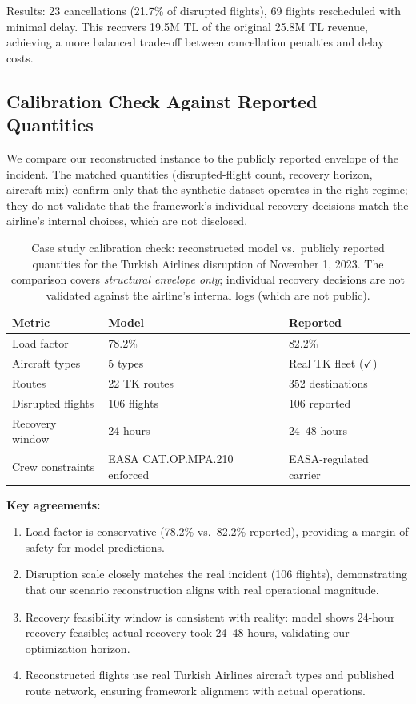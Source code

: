 \documentclass[12pt,number]{elsarticle}
\begin{document}
Results: 23 cancellations (21.7\% of disrupted flights), 69 flights rescheduled with minimal delay. This recovers 19.5M TL of the original 25.8M TL revenue, achieving a more balanced trade-off between cancellation penalties and delay costs.

\subsection{Calibration Check Against Reported Quantities}

We compare our reconstructed instance to the publicly reported envelope of the incident. The matched quantities (disrupted-flight count, recovery horizon, aircraft mix) confirm only that the synthetic dataset operates in the right regime; they do not validate that the framework's individual recovery decisions match the airline's internal choices, which are not disclosed.

\begin{table}[H]
\centering
\small
\caption{Case study calibration check: reconstructed model vs.\ publicly reported quantities for the Turkish Airlines disruption of November 1, 2023. The comparison covers \emph{structural envelope only}; individual recovery decisions are not validated against the airline's internal logs (which are not public).}
\label{tab:casestudy}
\begin{tabular}{@{}p{2.5cm}p{3cm}p{3cm}@{}}
\toprule
\textbf{Metric} & \textbf{Model} & \textbf{Reported} \\
\midrule
Load factor & 78.2\% & 82.2\% \\
Aircraft types & 5 types & Real TK fleet ($\checkmark$) \\
Routes & 22 TK routes & 352 destinations \\
Disrupted flights & 106 flights & 106 reported \\
Recovery window & 24 hours & 24--48 hours \\
Crew constraints & EASA CAT.OP.MPA.210 enforced & EASA-regulated carrier \\
\bottomrule
\end{tabular}
\end{table}

\textbf{Key agreements:}
\begin{enumerate}
\item Load factor is conservative (78.2\% vs.\ 82.2\% reported), providing a margin of safety for model predictions.
\item Disruption scale closely matches the real incident (106 flights), demonstrating that our scenario reconstruction aligns with real operational magnitude.
\item Recovery feasibility window is consistent with reality: model shows 24-hour recovery feasible; actual recovery took 24--48 hours, validating our optimization horizon.
\item Reconstructed flights use real Turkish Airlines aircraft types and published route network, ensuring framework alignment with actual operations.
\end{enumerate}
\end{document}
